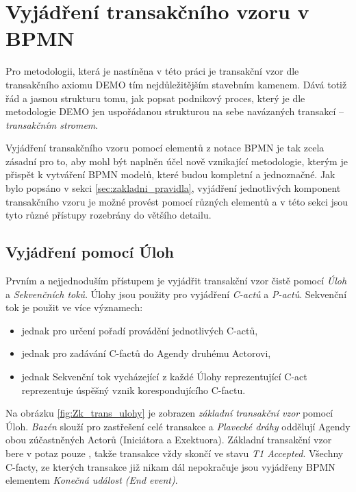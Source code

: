 \documentclass[]{article}
\begin{document}
\section{Vyjádření transakčního vzoru v BPMN}
Pro metodologii, která je nastíněna v této práci je transakční vzor dle transakčního axiomu DEMO tím nejdůležitějším stavebním kamenem. Dává totiž řád a jasnou strukturu tomu, jak popsat podnikový proces, který je dle metodologie DEMO jen uspořádanou strukturou na sebe navázaných transakcí – \textit{transakčním stromem}.

Vyjádření transakčního vzoru pomocí elementů z notace BPMN je tak zcela zásadní pro to, aby mohl být naplněn účel nově vznikající metodologie, kterým je přispět k vytváření BPMN modelů, které budou kompletní a jednoznačné. Jak bylo popsáno v sekci \ref{sec:zakladni_pravidla}, vyjádření jednotlivých komponent transakčního vzoru je možné provést pomocí různých elementů a v této sekci jsou tyto různé přístupy rozebrány do většího detailu. 

\subsection{Vyjádření pomocí Úloh} \label{sec:vyjadreni_ulohy}
Prvním a nejjednoduším přístupem je vyjádřit transakční vzor čistě pomocí \textit{Úloh} a \textit{Sekvenčních toků}. Úlohy jsou použity pro vyjádření \textit{C-actů} a \textit{P-actů}. Sekvenční tok je použit ve více významech:

\begin{itemize}
\item jednak pro určení pořadí provádění jednotlivých C-actů,
\item jednak pro zadávání C-factů do Agendy druhému Actorovi,
\item jednak Sekvenční tok vycházející z každé Úlohy reprezentující C-act reprezentuje úspěšný vznik korespondujícího C-factu.
\end{itemize}

Na obrázku \ref{fig:Zk_trans_ulohy} je zobrazen \textit{základní transakční vzor} pomocí Úloh. \textit{Bazén} slouží pro zastřešení celé transakce a \textit{Plavecké dráhy} oddělují Agendy obou zúčastněných Actorů (Iniciátora a Exektuora). Základní transakční vzor bere v potaz pouze , takže transakce vždy skončí ve stavu \textit{T1 Accepted}. Všechny C-facty, ze kterých transakce již nikam dál nepokračuje jsou vyjádřeny BPMN elementem \textit{Konečná událost (End event)}.
\end{document}
